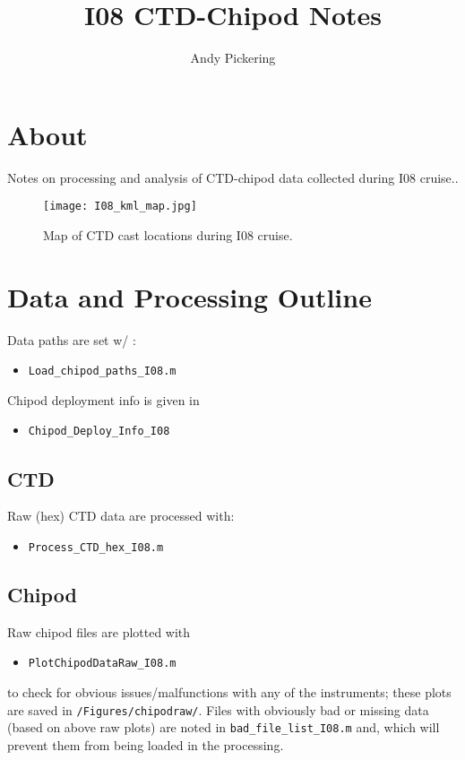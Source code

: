 \documentclass[11pt]{article}
\title{I08 CTD-Chipod Notes}
\author{Andy Pickering}
\begin{document}
\maketitle

\tableofcontents
\newpage

\section{About}

Notes on processing and analysis of CTD-chipod data collected during I08 cruise..

\begin{figure}[htbp]
\texttt{[image: I08\_kml\_map.jpg]}
\caption{Map of CTD cast locations during I08 cruise.}
\label{map}
\end{figure}


\section{Data and Processing Outline}

Data paths are set w/ : 
\begin{itemize}
\item \verb+Load_chipod_paths_I08.m+
\end{itemize}

Chipod deployment info is given in 
\begin{itemize}
\item \verb+Chipod_Deploy_Info_I08+
\end{itemize}


\subsection{CTD}

Raw (hex) CTD data are processed with:
\begin{itemize}
\item \verb+Process_CTD_hex_I08.m+
\end{itemize}

\subsection{Chipod}

Raw chipod files are plotted with 
\begin{itemize}
\item \verb+PlotChipodDataRaw_I08.m+
\end{itemize}
to check for obvious issues/malfunctions with any of the instruments; these plots are saved in \verb+/Figures/chipodraw/+. Files with obviously bad or missing data (based on above raw plots) are noted in \verb+bad_file_list_I08.m+ and, which will prevent them from being loaded in the processing.
\end{document}
